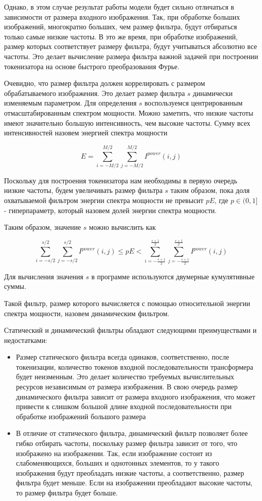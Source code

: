 \documentclass[times,specification,annotation]{itmo-student-thesis}
\begin{document}
Однако, в этом случае результат работы модели будет сильно отличаться в зависимости от размера входного изображения. Так, при обработке больших изображений, многократно больших, чем размер фильтра, будут отбираться только самые низкие частоты. В это же время, при обработке изображений, размер которых соответствует размеру фильтра, будут учитываться абсолютно все частоты. Это делает вычисление размера фильтра важной задачей при построении токенизатора на основе быстрого преобразования Фурье.

Очевидно, что размер фильтра должен коррелировать с размером обрабатываемого изображения. Это делает размер фильтра $s$ динамически изменяемым параметром. Для определения $s$ воспользуемся центрированным отмасштабированным спектром мощности. Можно заметить, что низкие частоты имеют значительно большую интенсивность, чем высокие частоты. Сумму всех интенсивностей назовем энергией спектра мощности 

$$
E = \sum\limits_{i=-M/2}^{M/2}\sum\limits_{j=-M/2}^{M/2} I^{power}(i, j)
$$ 

Поскольку для построения токенизатора нам необходимы в первую очередь низкие частоты, будем увеличивать размер фильтра $s$ таким образом, пока доля охватываемой фильтром энергии спектра мощности не превысит $pE$, где $p \in (0, 1]$ - гиперпараметр, который назовем долей энергии спектра мощности.

Таким образом, значение $s$ можно вычислить как

$$
\sum_{i=-s/2}^{s/2}\sum_{j=-s/2}^{s/2} I^{power}(i, j) \leq pE < \sum_{i=-\frac{s+1}{2}}^{\frac{s+1}{2}}\sum_{j=-\frac{s+1}{2}}^{\frac{s+1}{2}} I^{power}(i, j)
$$

Для вычисления значения $s$ в программе используются двумерные кумулятивные суммы.

Такой фильтр, размер которого вычисляется с помощью относительной энергии спектра мощности, назовем динамическим фильтром. 

Статический и динамический фильтры обладают следующими преимуществами и недостатками:

\begin{itemize}
    \item Размер статического фильтра всегда одинаков, соответственно, после токенизации, количество токенов входной последовательности трансформера будет неизменным. Это делает количество требуемых вычислительных ресурсов независимым от размера изображения. В свою очередь размер динамического фильтра зависит от размера входного изображения, что может привести к слишком большой длине входной последовательности при обработке изображений большого размера
    \item В отличие от статического фильтра, динамический фильтр позволяет более гибко отбирать частоты, поскольку размер фильтра зависит от того, что изображено на изображении. Так, если изображение состоит из слабоменяющихся, больших и однотонных элементов, то у такого изображения будут преобладать низкие частоты, а соответственно, размер фильтра будет меньше. Если на изображении преобладают высокие частоты, то размер фильтра будет больше.
\end{itemize}
\end{document}

